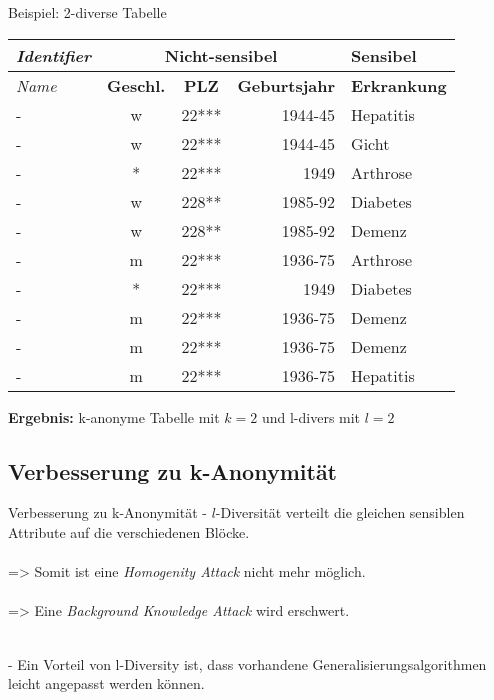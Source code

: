 \begin{frame}{Beispiel: 2-diverse Tabelle}
	\begin{center}
			\begin{tabular}{|l|c|c|r|l|}
		\hline \textit{Identifier} & \multicolumn{3}{c|}{\textbf{Nicht-sensibel}} & \textbf{Sensibel} \\ 
		\hline \textit{Name} & \textbf{Geschl.} & \textbf{PLZ} & \textbf{Geburtsjahr} & \textbf{Erkrankung} \\ \hline
		\hline \rowcolor{svshellblau1!30} 	- & w & 22*** & 1944-45 & Hepatitis \\ 
		\hline \rowcolor{svshellblau1!30}	- & w & 22*** & 1944-45 & Gicht \\ 
		\hline \rowcolor{svsgrau1!30} 		- & * & 22*** & 1949 & Arthrose \\ 
		\hline \rowcolor{svshellblau2!30} 	- & w & 228** & 1985-92 & Diabetes \\
		\hline \rowcolor{svshellblau2!30} 	- & w & 228** & 1985-92 & Demenz \\  
		\hline \rowcolor{svsrot!30} 		- & m & 22*** & 1936-75 & Arthrose \\ 
		\hline \rowcolor{svsgrau1!30} 		- & * & 22*** & 1949 & Diabetes \\ 
		\hline \rowcolor{svsrot!30} 		- & m & 22*** & 1936-75 & Demenz \\ 
		\hline \rowcolor{svsrot!30} 		- & m & 22*** & 1936-75 & Demenz \\ 
		\hline \rowcolor{svsrot!30} 		- & m & 22*** & 1936-75 & Hepatitis \\ 
		\hline 
		\end{tabular}
		\vspace{0.5cm}
        
		\textbf{Ergebnis:} k-anonyme Tabelle mit \(k=2\) und l-divers mit \(l=2\)
	\end{center}
\end{frame}


\subsection{Verbesserung zu k-Anonymität}

\begin{frame}{Verbesserung zu k-Anonymität}
- $l$-Diversität verteilt die gleichen sensiblen Attribute auf die verschiedenen Blöcke.\\
\ \\ => Somit ist eine \textit{Homogenity Attack} nicht mehr möglich.\\
\ \\ => Eine \textit{Background Knowledge Attack} wird erschwert.\\
\ \\ \tiny \cite{machanavajjhala_l_diversity}

\vspace{1.0cm}

\normalsize
- Ein Vorteil von l-Diversity ist, dass vorhandene Generalisierungsalgorithmen leicht angepasst werden können.

\end{frame}


